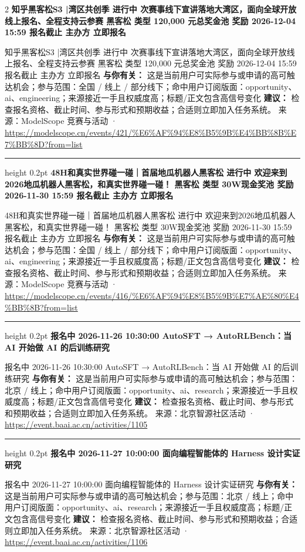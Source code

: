 \documentclass[10.5pt]{ctexart}
\begin{document}
\begin{multicols}{2}
{\large\bfseries 知乎黑客松S3 |湾区共创季 进行中 次赛事线下宣讲落地大湾区，面向全球开放线上报名、全程支持云参赛 黑客松 类型 120,000 元总奖金池 奖励 2026-12-04 15:59 报名截止 主办方 立即报名}\par
知乎黑客松S3 |湾区共创季 进行中 次赛事线下宣讲落地大湾区，面向全球开放线上报名、全程支持云参赛 黑客松 类型 120,000 元总奖金池 奖励 2026-12-04 15:59 报名截止 主办方 立即报名
\textbf{与你有关：} 这是当前用户可实际参与或申请的高可触达机会；参与范围：全国 / 线上 / 部分线下；命中用户订阅版面：opportunity、ai、engineering；来源接近一手且权威度高；标题/正文包含高信号变化
\textbf{建议：} 检查报名资格、截止时间、参与形式和预期收益；合适则立即加入任务系统。
{\footnotesize\color{ormuted} 来源：ModelScope 竞赛与活动 · \url{https://modelscope.cn/events/421/%E6%AF%94%E8%B5%9B%E4%BB%8B%E7%BB%8D?from=list}}
\vspace{2mm}
\hrule height 0.2pt
\vspace{2mm}
{\large\bfseries 48H和真实世界碰一碰｜首届地瓜机器人黑客松 进行中 欢迎来到2026地瓜机器人黑客松，和真实世界碰一碰！ 黑客松 类型 30W现金奖池 奖励 2026-11-30 15:59 报名截止 主办方 立即报名}\par
48H和真实世界碰一碰｜首届地瓜机器人黑客松 进行中 欢迎来到2026地瓜机器人黑客松，和真实世界碰一碰！ 黑客松 类型 30W现金奖池 奖励 2026-11-30 15:59 报名截止 主办方 立即报名
\textbf{与你有关：} 这是当前用户可实际参与或申请的高可触达机会；参与范围：全国 / 线上 / 部分线下；命中用户订阅版面：opportunity、ai、engineering；来源接近一手且权威度高；标题/正文包含高信号变化
\textbf{建议：} 检查报名资格、截止时间、参与形式和预期收益；合适则立即加入任务系统。
{\footnotesize\color{ormuted} 来源：ModelScope 竞赛与活动 · \url{https://modelscope.cn/events/416/%E6%AF%94%E8%B5%9B%E7%AE%80%E4%BB%8B?from=list}}
\vspace{2mm}
\hrule height 0.2pt
\vspace{2mm}
{\large\bfseries 报名中 2026-11-26 10:30:00 AutoSFT → AutoRLBench：当 AI 开始做 AI 的后训练研究}\par
报名中 2026-11-26 10:30:00 AutoSFT → AutoRLBench：当 AI 开始做 AI 的后训练研究
\textbf{与你有关：} 这是当前用户可实际参与或申请的高可触达机会；参与范围：北京 / 线上；命中用户订阅版面：opportunity、ai、research；来源接近一手且权威度高；标题/正文包含高信号变化
\textbf{建议：} 检查报名资格、截止时间、参与形式和预期收益；合适则立即加入任务系统。
{\footnotesize\color{ormuted} 来源：北京智源社区活动 · \url{https://event.baai.ac.cn/activities/1105}}
\vspace{2mm}
\hrule height 0.2pt
\vspace{2mm}
{\large\bfseries 报名中 2026-11-27 10:00:00 面向编程智能体的 Harness 设计实证研究}\par
报名中 2026-11-27 10:00:00 面向编程智能体的 Harness 设计实证研究
\textbf{与你有关：} 这是当前用户可实际参与或申请的高可触达机会；参与范围：北京 / 线上；命中用户订阅版面：opportunity、ai、research；来源接近一手且权威度高；标题/正文包含高信号变化
\textbf{建议：} 检查报名资格、截止时间、参与形式和预期收益；合适则立即加入任务系统。
{\footnotesize\color{ormuted} 来源：北京智源社区活动 · \url{https://event.baai.ac.cn/activities/1106}}
\end{multicols}
\end{document}
